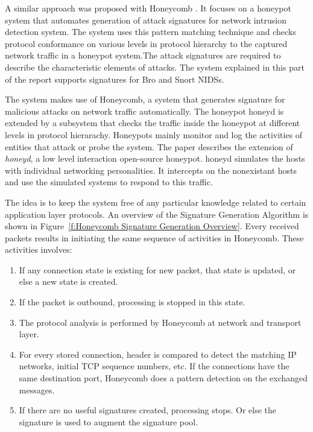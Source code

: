 \documentclass[article,msc=informatik,type=msc,colorback,accentcolor=tud9c]{tudthesis}
\begin{document}
	
	\vspace{3mm}
	A similar approach was proposed with Honeycomb\cite{kreibich2004honeycomb} . It focuses on a honeypot system that automates generation of attack signatures for network intrusion detection system. The system uses this pattern matching technique and checks protocol conformance on various levels in protocol hierarchy to the captured network traffic in a honeypot system.The attack signatures are required to describe the characteristic elements of attacks. The system explained in this part of the report supports signatures for Bro and Snort \ac{NIDS}s.
	
	\vspace{3mm}
	The system makes use of Honeycomb, a system that generates signature for malicious attacks on network traffic automatically. The honeypot honeyd\cite{Provos:2004:VHF:1251375.1251376} is extended by a subsystem that checks the traffic inside the honeypot at different levels in protocol hierarachy. Honeypots mainly monitor and log the activities of entities that attack or probe the system. The paper describes the extension of \textit{honeyd}, a low level interaction open-source honeypot. honeyd simulates the hosts with individual networking personalities. It intercepts on the nonexistant hosts and use the simulated systems to respond to this traffic.

	\vspace{3mm}
	The idea is to keep the system free of any particular knowledge related to certain application layer protocols. An overview of the Signature Generation Algorithm is shown in Figure~\ref{f:Honeycomb Signature Generation Overview}. Every received packets results in initiating the same sequence of activities in Honeycomb. These activities involves:


	\begin{enumerate}
	\item If any connection state is existing for new packet, that state is updated, or else a new state is created.
	\item If the packet is outbound, processing is stopped in this state.
	\item The protocol analysis is performed by Honeycomb at network and transport layer.
	\item For every stored connection, header is compared to detect the matching \ac{IP} networks, initial \ac{TCP} sequence numbers, etc. If the connections have the same destination port, Honeycomb does a pattern detection on the exchanged messages.
	\item If there are no useful signatures created, processing stops. Or else the signature is used to augment the signature pool.
	\end{enumerate}
	
\end{document}
